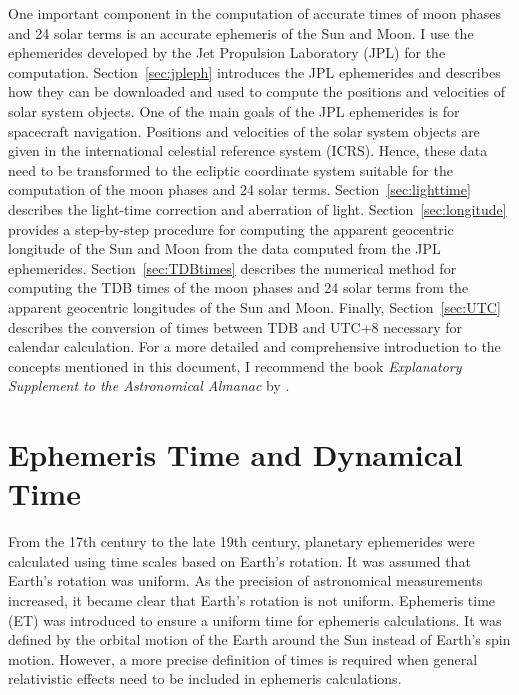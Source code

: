 \documentclass[12pt]{article}
\newcommand{\expl}{\cite{expl}}
\begin{document}
\begin{CJK}{UTF8}{bkai}
One important component in the computation of accurate times of moon phases 
and 24 solar terms is an accurate ephemeris of the Sun and Moon. I use the 
ephemerides developed by the Jet Propulsion Laboratory (JPL) for the 
computation. Section~\ref{sec:jpleph} introduces the JPL ephemerides
and describes how they can be downloaded and used to 
compute the positions and velocities of solar system objects. One of the 
main goals of the JPL ephemerides is for spacecraft navigation. 
Positions and velocities of the solar system objects are given in 
the international 
celestial reference system (ICRS). Hence, these data need to be transformed 
to the ecliptic coordinate system suitable for the computation of the moon phases 
and 24 solar terms. Section~\ref{sec:lighttime} describes the light-time 
correction and aberration of light. Section~\ref{sec:longitude} provides 
a step-by-step procedure for computing the apparent geocentric longitude 
of the Sun and Moon from the data computed from the JPL ephemerides. 
Section~\ref{sec:TDBtimes} describes the numerical method for computing the TDB 
times of the moon phases and 24 solar terms from the apparent geocentric 
longitudes of the Sun and Moon. Finally, Section~\ref{sec:UTC} describes 
the conversion of times between TDB and UTC+8 necessary for calendar calculation. 
For a more detailed and comprehensive introduction to the concepts 
mentioned in this document, I recommend the book 
{\it Explanatory Supplement to the Astronomical Almanac} by \expl.

\section{Ephemeris Time and Dynamical Time}
\label{sec:ET}

From the 17th century to the late 19th century, planetary ephemerides 
were calculated using time scales based on Earth's rotation. It was 
assumed that Earth's rotation was uniform. As the precision of astronomical 
measurements increased, it became clear that Earth's rotation is not uniform. 
Ephemeris time (ET) was introduced to ensure a uniform time for ephemeris calculations.
It was defined by the orbital motion of the Earth 
around the Sun instead of Earth's spin motion. However, a more precise 
definition of times is required when general relativistic effects need to be included 
in ephemeris calculations.


\end{CJK}
\end{document}
